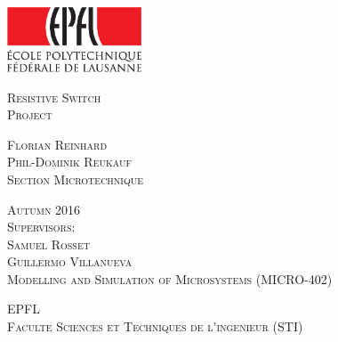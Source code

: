 


\newcommand{\Ptype}{Project} %
\newcommand{\Ptitle}{Resistive Switch}
\newcommand{\Pcand}{Florian Reinhard \\ Phil-Dominik Reukauf}
\newcommand{\Psect}{Section Microtechnique}
\newcommand{\Pfirst}{Samuel Rosset}
\newcommand{\Psecond}{Guillermo Villanueva}
\newcommand{\Pseason}{Autumn 2016} %



\begin{titlepage}

\begin{center}


\includegraphics[width=4cm]{logo_epfl_coul.eps}

\vspace*{4cm}
\Huge
\textsc{\Ptitle}\\
\vspace{0.5cm}
\vspace{0.5cm}
\normalsize
\textsc{\Ptype }\\ %
\vspace{1cm}

\large
\textsc{\Pcand\\[0.5\baselineskip] }
\normalsize
\textsc{\Psect}\\
\vspace{0.6cm}

\textsc{\Pseason}\\ %
\vspace{0.6cm}
\textsc{Supervisors:\\ \Pfirst\\ \Psecond}\\
\vspace{0.6cm}
\textsc{Modelling and Simulation of Microsystems (MICRO-402)}


\vspace{0.6cm}
\textsc{EPFL\\
Faculte Sciences et Techniques de l'ingenieur (STI)}\\

\end{center}

\end{titlepage}
